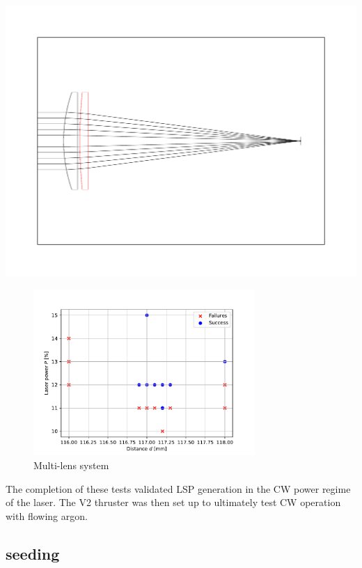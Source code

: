             \includegraphics[width=\textwidth]{assets/5 results/500 and 150 lenses.pdf}

            \begin{figure}[h]
                \centering
                \includegraphics[width=0.75\textwidth]{assets/5 results/duallens_focus_threshold.pdf}
                \caption{Multi-lens system}
            \end{figure}


            The completion of these tests validated LSP generation in the CW power regime of the laser. The V2 thruster was then set up to ultimately test CW operation with flowing argon.
        
        \subsection{ seeding}
            
